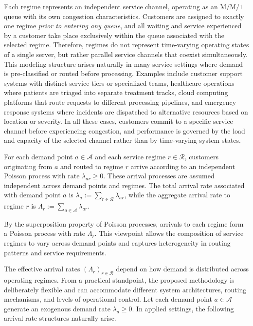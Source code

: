 \documentclass[letter,11pt, reqno]{amsart}
\def\A{\mathcal{A}}
\def\RR{\mathcal{R}}
\begin{document}
Each regime represents an independent service channel, operating as an
$\mathrm{M}/\mathrm{M}/1$ queue with its own congestion characteristics. Customers
are assigned to exactly one regime \emph{prior to entering any queue}, and all
waiting and service experienced by a customer take place exclusively within the
queue associated with the selected regime. Therefore, regimes do not represent
time-varying operating states of a single server, but rather parallel service
channels that coexist simultaneously. This modeling structure arises naturally in many service settings where demand is
pre-classified or routed before processing. Examples include customer support
systems with distinct service tiers or specialized teams, healthcare operations
where patients are triaged into separate treatment tracks, cloud computing
platforms that route requests to different processing pipelines, and emergency
response systems where incidents are dispatched to alternative resources based on
location or severity. In all these cases, customers commit to a specific service
channel before experiencing congestion, and performance is governed by the load
and capacity of the selected channel rather than by time-varying system states.

For each demand point $a\in\mathcal{A}$ and each service regime $r\in\mathcal{R}$,
customers originating from $a$ and routed to regime $r$ arrive according to an
independent Poisson process with rate $\lambda_{ar}\ge 0$. These arrival processes
are assumed independent across demand points and regimes. The total arrival rate
associated with demand point $a$ is $\lambda_a := \sum_{r\in\mathcal{R}} \lambda_{ar}$,
while the aggregate arrival rate to regime $r$ is $\Lambda_r := \sum_{a\in\mathcal{A}} \lambda_{ar}$.

By the superposition property of Poisson processes, arrivals to each regime form a
Poisson process with rate $\Lambda_r$. This viewpoint allows the composition of
service regimes to vary across demand points and captures heterogeneity in routing
patterns and service requirements.

The effective arrival rates $(\Lambda_r)_{r\in\RR}$ depend on how demand is distributed across operating regimes.
From a practical standpoint, the proposed methodology is deliberately flexible and can accommodate
different system architectures, routing mechanisms, and levels of operational control.
Let each demand point $a\in\A$ generate an exogenous demand rate $\lambda_a \ge 0$.
In applied settings, the following arrival rate structures naturally arise.
\end{document}
